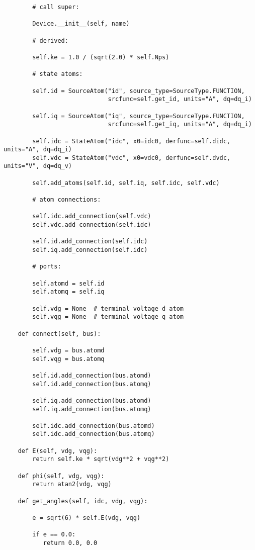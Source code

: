 \begin{lstlisting}
        # call super:

        Device.__init__(self, name)

        # derived:

        self.ke = 1.0 / (sqrt(2.0) * self.Nps)

        # state atoms:

        self.id = SourceAtom("id", source_type=SourceType.FUNCTION,
                             srcfunc=self.get_id, units="A", dq=dq_i)

        self.iq = SourceAtom("iq", source_type=SourceType.FUNCTION,
                             srcfunc=self.get_iq, units="A", dq=dq_i)

        self.idc = StateAtom("idc", x0=idc0, derfunc=self.didc, units="A", dq=dq_i)
        self.vdc = StateAtom("vdc", x0=vdc0, derfunc=self.dvdc, units="V", dq=dq_v)

        self.add_atoms(self.id, self.iq, self.idc, self.vdc)

        # atom connections:

        self.idc.add_connection(self.vdc)
        self.vdc.add_connection(self.idc)

        self.id.add_connection(self.idc)
        self.iq.add_connection(self.idc)

        # ports:

        self.atomd = self.id
        self.atomq = self.iq

        self.vdg = None  # terminal voltage d atom
        self.vqg = None  # terminal voltage q atom

    def connect(self, bus):

        self.vdg = bus.atomd
        self.vqg = bus.atomq

        self.id.add_connection(bus.atomd)
        self.id.add_connection(bus.atomq)

        self.iq.add_connection(bus.atomd)
        self.iq.add_connection(bus.atomq)

        self.idc.add_connection(bus.atomd)
        self.idc.add_connection(bus.atomq)

    def E(self, vdg, vqg):
        return self.ke * sqrt(vdg**2 + vqg**2)

    def phi(self, vdg, vqg):
        return atan2(vdg, vqg)

    def get_angles(self, idc, vdg, vqg):

        e = sqrt(6) * self.E(vdg, vqg)

        if e == 0.0:
           return 0.0, 0.0


\end{lstlisting}

